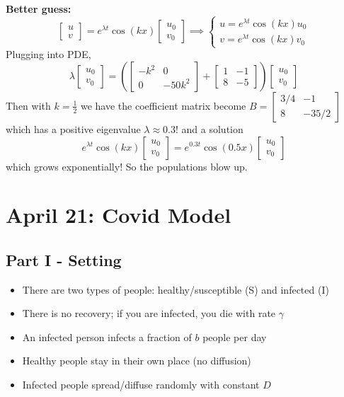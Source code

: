 \documentclass[12pt]{article}
\begin{document}
\textbf{Better guess:}
\[\begin{bmatrix}
    u\\v
\end{bmatrix} = e^{\lambda t}\cos(k x)\begin{bmatrix}
    u_0\\v_0
\end{bmatrix} \implies \begin{cases}
    u= e^{\lambda t}\cos(k x)u_0\\
    v = e^{\lambda t}\cos(k x)v_0
\end{cases}\]
Plugging into PDE, 
\[\lambda \begin{bmatrix}
    u_0\\
    v_0
\end{bmatrix} = \left(\begin{bmatrix}
    -k^2 & 0\\
    0 & -50k^2
\end{bmatrix} + \begin{bmatrix}
    1 & -1\\
    8 & -5
\end{bmatrix}\right)\begin{bmatrix}
    u_0\\
    v_0
\end{bmatrix}\]
Then with $k = \frac{1}{2}$ we have the coefficient matrix become $B = \begin{bmatrix}
    3/4 & -1\\
    8 & -35/2
\end{bmatrix}$ which has a positive eigenvalue $\lambda \approx 0.3$! and a solution 
\[e^{\lambda t} \cos(k x) \begin{bmatrix}
    u_0\\v_0
\end{bmatrix} = e^{0.3t}\cos(0.5x)\begin{bmatrix}
    u_0\\
    v_0
\end{bmatrix}\]
which grows exponentially! So the populations blow up. 

\section{April 21: Covid Model}
\subsection*{Part I - Setting}
\begin{itemize}
    \item There are two types of people: healthy/susceptible (S) and infected (I)
    \item There is no recovery; if you are infected, you die with rate $\gamma$
    \item An infected person infects a fraction of $b$ people per day
    \item Healthy people stay in their own place (no diffusion)
    \item Infected people spread/diffuse randomly with constant $D$
\end{itemize}
\end{document}
